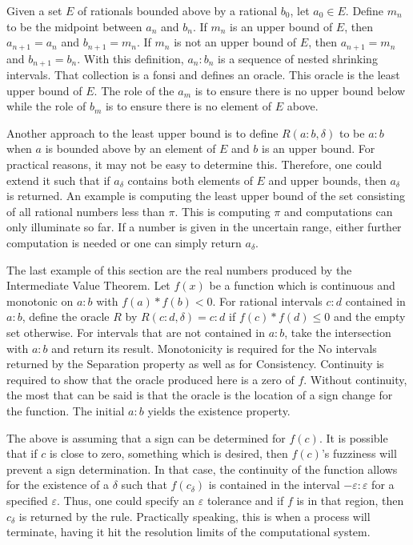 \documentclass[12pt]{article}
\begin{document}
Given a set $E$ of rationals bounded above by a rational $b_0$, let $a_0 \in E$. Define $m_n$ to be the midpoint between $a_n$ and $b_n$. If $m_n$ is an upper bound of $E$, then $a_{n+1} = a_n$ and $b_{n+1}=m_n$. If $m_n$ is not an upper bound of $E$, then $a_{n+1} = m_n$ and $b_{n+1} = b_n$. With this definition, $a_n:b_n$ is a sequence of nested shrinking intervals. That collection is a fonsi and defines an oracle. This oracle is the least upper bound of $E$. The role of the $a_m$ is to ensure there is no upper bound below while the role of $b_m$ is to ensure there is no element of $E$ above. 

Another approach to the least upper bound is to define $R(a:b, \delta)$ to be $a:b$ when $a$ is bounded above by an element of $E$ and $b$ is an upper bound. For practical reasons, it may not be easy to determine this. Therefore, one could extend it such that if $a_\delta$ contains both elements of $E$ and upper bounds, then $a_\delta$ is returned. An example is computing the least upper bound of the set consisting of all rational numbers less than $\pi$. This is computing $\pi$ and computations can only illuminate so far. If a number is given in the uncertain range, either further computation is needed or one can simply return $a_\delta$. 

The last example of this section are the real numbers produced by the Intermediate Value Theorem. Let $f(x)$ be a function which is continuous and monotonic on $a:b$ with $f(a)*f(b) < 0$. For rational intervals $c:d$ contained in $a:b$, define the oracle $R$ by $R(c:d, \delta) = c:d$ if $f(c)*f(d) \leq 0$ and the empty set otherwise. For intervals that are not contained in $a:b$, take the intersection with $a:b$ and return its result. Monotonicity is required for the No intervals returned by the Separation property as well as for Consistency. Continuity is required to show that the oracle produced here is a zero of $f$. Without continuity, the most that can be said is that the oracle is the location of a sign change for the function. The initial $a:b$ yields the existence property. 

The above is assuming that a sign can be determined for $f(c)$. It is possible that if $c$ is close to zero, something which is desired, then $f(c)$'s fuzziness will prevent a sign determination. In that case, the continuity of the function allows for the existence of a $\delta$ such that $f(c_{\delta})$ is contained in the interval $-\varepsilon:\varepsilon$ for a specified $\varepsilon$. Thus, one could specify an $\varepsilon$ tolerance and if $f$ is in that region, then $c_\delta$ is returned by the rule. Practically speaking, this is when a process will terminate, having it hit the resolution limits of the computational system. 
\end{document}

